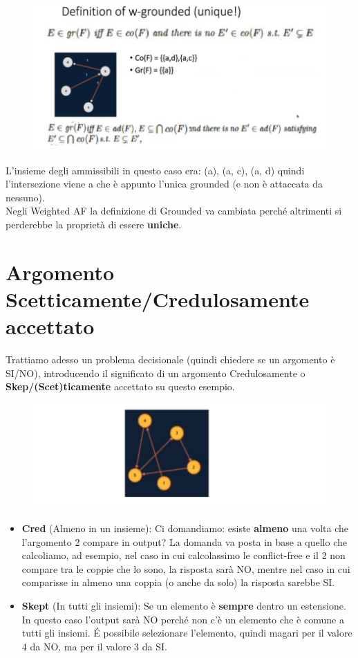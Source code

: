     \begin{figure}[htp]
        \centering
        \includegraphics[width=12cm, keepaspectratio]{img/Cap6/w-gounded2.png}
    \end{figure}
    L'insieme degli ammissibili in questo caso era: (a), (a, c), (a, d) quindi
    l'intersezione viene a che è appunto l'unica grounded (e non è attaccata da
    nessuno). \\Negli Weighted AF la definizione di Grounded va cambiata perché
    altrimenti si perderebbe la proprietà di essere \textbf{uniche}.
    \section{Argomento Scetticamente/Credulosamente accettato}
    Trattiamo adesso un problema decisionale (quindi chiedere se un argomento è
    SI/NO), introducendo il significato di un argomento Credulosamente o
    \textbf{Skep/(Scet)ticamente }accettato su questo esempio.
    \begin{figure}[htp]
        \centering
        \includegraphics[width=12cm, keepaspectratio]{img/Cap6/scet.png}
    \end{figure}
    \begin{itemize}
        \item \textbf{Cred} (Almeno in un insieme): Ci domandiamo: esiste
              \textbf{almeno} una volta che l'argomento 2 compare in output? La
              domanda va posta in base a quello che calcoliamo, ad esempio, nel caso
              in cui calcolassimo le conflict-free e il 2 non compare tra le coppie
              che lo sono, la risposta sarà NO, mentre nel caso in cui comparisse in
              almeno una coppia (o anche da solo) la risposta sarebbe SI.
        \item \textbf{Skept} (In tutti gli insiemi): Se un elemento è
              \textbf{sempre} dentro un estensione. In questo caso l'output sarà NO
              perché non c'è un elemento che è comune a tutti gli insiemi. É possibile
              selezionare l'elemento, quindi magari per il valore 4 da NO, ma per il
              valore 3 da SI.
    \end{itemize}

